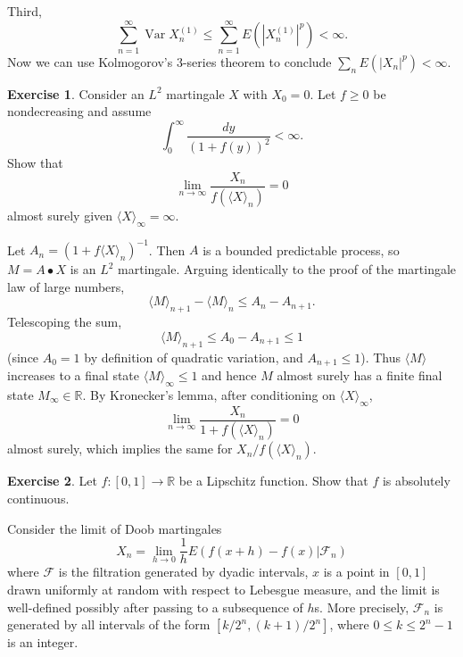 \documentclass[10pt]{article}
\newcommand{\RR}{\mathbb{R}}
\DeclareMathOperator{\Var}{Var}
\theoremstyle{definition}
\newtheorem{exer}{Exercise}
\begin{document}
Third,
$$\sum_{n=1}^\infty \Var X_n^{(1)} \leq \sum_{n=1}^\infty E(|X_n^{(1)}|^p) < \infty.$$
Now we can use Kolmogorov's $3$-series theorem to conclude $\sum_n E(|X_n|^p) < \infty$.

\begin{exer}
Consider an $L^2$ martingale $X$ with $X_0 = 0$.
Let $f \geq 0$ be nondecreasing and assume
$$\int_0^\infty \frac{dy}{(1 + f(y))^2} < \infty.$$
Show that
$$\lim_{n \to \infty} \frac{X_n}{f(\langle X\rangle_n)} = 0$$
almost surely given $\langle X\rangle_\infty = \infty$.
\end{exer}

Let $A_n = (1 + f\langle X\rangle_n)^{-1}$. Then $A$ is a bounded predictable process, so $M = A \bullet X$ is an $L^2$ martingale.
Arguing identically to the proof of the martingale law of large numbers,
$$\langle M\rangle_{n+1} - \langle M\rangle_n \leq A_n - A_{n+1}.$$
Telescoping the sum,
$$\langle M\rangle_{n+1} \leq A_0 - A_{n+1} \leq 1$$
(since $A_0 = 1$ by definition of quadratic variation, and $A_{n+1} \leq 1$).
Thus $\langle M\rangle$ increases to a final state $\langle M\rangle_\infty \leq 1$ and hence $M$ almost surely has a finite final state $M_\infty \in \RR$.
By Kronecker's lemma, after conditioning on $\langle X\rangle_\infty$,
$$\lim_{n \to \infty} \frac{X_n}{1 + f(\langle X\rangle_n)} = 0$$
almost surely, which implies the same for $X_n/f(\langle X\rangle_n)$.

\begin{exer}
Let $f: [0, 1] \to \RR$ be a Lipschitz function. Show that $f$ is absolutely continuous.
\end{exer}

Consider the limit of Doob martingales
$$X_n = \lim_{h \to 0} \frac{1}{h} E(f(x+h) - f(x)|\mathcal F_n)$$
where $\mathcal F$ is the filtration generated by dyadic intervals, $x$ is a point in $[0, 1]$ drawn uniformly at random with respect to Lebesgue measure, and the limit is well-defined possibly after passing to a subsequence of $h$s.
More precisely, $\mathcal F_n$ is generated by all intervals of the form $[k/2^n, (k+1)/2^n]$, where $0 \leq k \leq 2^n - 1$ is an integer.
\end{document}
